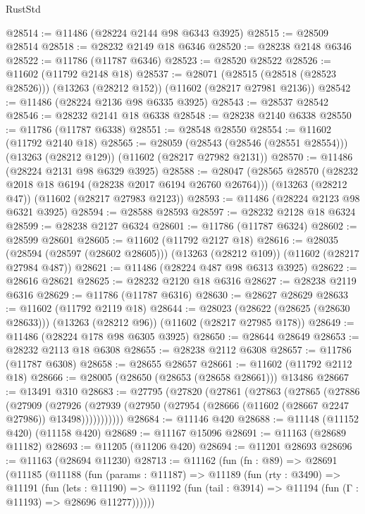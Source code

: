\begin{lexlean}{RustStd}
\begin{coremodule}
@28514 := @11486 (@28224 @2144 @98 @6343 @3925)
@28515 := @28509 @28514
@28518 := @28232 @2149 @18 @6346
@28520 := @28238 @2148 @6346
@28522 := @11786 (@11787 @6346)
@28523 := @28520 @28522
@28526 := @11602 (@11792 @2148 @18)
@28537 := @28071
    (@28515 (@28518 (@28523 @28526)))
    (@13263 (@28212 @152))
    (@11602 (@28217 @27981 @2136))
@28542 := @11486 (@28224 @2136 @98 @6335 @3925)
@28543 := @28537 @28542
@28546 := @28232 @2141 @18 @6338
@28548 := @28238 @2140 @6338
@28550 := @11786 (@11787 @6338)
@28551 := @28548 @28550
@28554 := @11602 (@11792 @2140 @18)
@28565 := @28059
    (@28543 (@28546 (@28551 @28554)))
    (@13263 (@28212 @129))
    (@11602 (@28217 @27982 @2131))
@28570 := @11486 (@28224 @2131 @98 @6329 @3925)
@28588 := @28047
    (@28565 @28570 (@28232 @2018 @18 @6194 (@28238 @2017 @6194 @26760 @26764)))
    (@13263 (@28212 @47))
    (@11602 (@28217 @27983 @2123))
@28593 := @11486 (@28224 @2123 @98 @6321 @3925)
@28594 := @28588 @28593
@28597 := @28232 @2128 @18 @6324
@28599 := @28238 @2127 @6324
@28601 := @11786 (@11787 @6324)
@28602 := @28599 @28601
@28605 := @11602 (@11792 @2127 @18)
@28616 := @28035
    (@28594 (@28597 (@28602 @28605)))
    (@13263 (@28212 @109))
    (@11602 (@28217 @27984 @487))
@28621 := @11486 (@28224 @487 @98 @6313 @3925)
@28622 := @28616 @28621
@28625 := @28232 @2120 @18 @6316
@28627 := @28238 @2119 @6316
@28629 := @11786 (@11787 @6316)
@28630 := @28627 @28629
@28633 := @11602 (@11792 @2119 @18)
@28644 := @28023
    (@28622 (@28625 (@28630 @28633)))
    (@13263 (@28212 @96))
    (@11602 (@28217 @27985 @178))
@28649 := @11486 (@28224 @178 @98 @6305 @3925)
@28650 := @28644 @28649
@28653 := @28232 @2113 @18 @6308
@28655 := @28238 @2112 @6308
@28657 := @11786 (@11787 @6308)
@28658 := @28655 @28657
@28661 := @11602 (@11792 @2112 @18)
@28666 := @28005 (@28650 (@28653 (@28658 @28661))) @13486
@28667 := @13491 @310
@28683 := @27795
    (@27820
      (@27861
        (@27863
          (@27865
            (@27886
              (@27909
                (@27926
                  (@27939 (@27950 (@27954 (@28666 (@11602 (@28667 @2247 @27986)) @13498)))))))))))
@28684 := @11146 @420
@28688 := @11148 (@11152 @420) (@11158 @420)
@28689 := @11167 @15096
@28691 := @11163 (@28689 @11182)
@28693 := @11205 (@11206 @420)
@28694 := @11201 @28693
@28696 := @11163 (@28694 @11230)
@28713 := @11162
    (fun (fn : @89) =>
    @28691
      (@11185
        (@11188
          (fun (params : @11187) =>
          @11189
            (fun (rty : @3490) =>
            @11191
              (fun (lets : @11190) =>
              @11192 (fun (tail : @3914) => @11194 (fun (Γ : @11193) => @28696 @11277))))))

\end{coremodule}
\end{lexlean}
